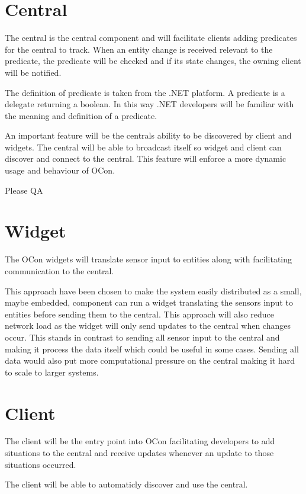 \documentclass[../report.tex]{subfiles}
\begin{document}
\section{Central}

The central is the central component and will facilitate clients adding predicates for the central to track. When an entity change is received relevant to the predicate, the predicate will be checked and if its state changes, the owning client will be notified.

The definition of predicate is taken from the .NET platform. A predicate is a delegate returning a boolean. In this way .NET developers will be familiar with the meaning and definition of a predicate.

An important feature will be the centrals ability to be discovered by client and widgets. The central will be able to broadcast itself so widget and client can discover and connect to the central. This feature will enforce a more dynamic usage and behaviour of OCon.

\todo Please QA
 

\section{Widget}

The OCon widgets will translate sensor input to entities along with facilitating communication to the central.

This approach have been chosen to make the system easily distributed as a small, maybe embedded, component can run a widget translating the sensors input to entities before sending them to the central. This approach will also reduce network load as the widget will only send updates to the central when changes occur. This stands in contrast to sending all sensor input to the central and making it process the data itself which could be useful in some cases. Sending all data would also put more computational pressure on the central making it hard to scale to larger systems.


\section{Client}

The client will be the entry point into OCon facilitating developers to add situations to the central and receive updates whenever an update to those situations occurred.

The client will be able to automaticly discover and use the central. 
\end{document}
